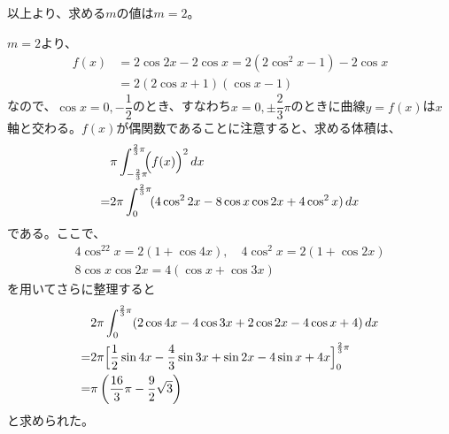 以上より、求める$m$の値は$m=2$。

$m=2$より、
\begin{align*}
 f(x)&=2\cos2x-2\cos x=2(2\cos^2x-1)-2\cos x \\
 &=2(2\cos x+1)(\cos x-1)
\end{align*}
なので、$\cos x=0, -\dfrac{1}{2}$のとき、すなわち$x=0, \pm\dfrac{2}{3}\pi$のときに曲線$y=f(x)$は$x$軸と交わる。$f(x)$が偶関数であることに注意すると、求める体積は、
\begin{align*}
 &\pi\int_{-\frac{2}{3}\pi}^{\frac{2}{3}\pi}\!\!\Bigl(f(x)\Bigr)^2 \,dx \\
 =& 2\pi\int_0^{\frac{2}{3}\pi}\!(4\cos^22x-8\cos x\cos 2x+4\cos^2 x) \,dx
\end{align*}
である。ここで、
\begin{align*}
 4\cos^22x=2(1+\cos 4x),\quad 4\cos^2x=2(1+\cos 2x) \\
 8\cos x\cos 2x=4(\cos x+\cos 3x)
\end{align*}
を用いてさらに整理すると
\begin{align*}
 & 2\pi\int_0^{\frac{2}{3}\pi}(2\cos 4x -4\cos 3x+2\cos 2x -4\cos x+4) \,dx \\
 =& 2\pi\Bigl[\frac{1}{2}\sin 4x-\frac{4}{3}\sin 3x+\sin 2x -4\sin x + 4x \Bigr]_0^{\frac{2}{3}\pi} \\
 =& \pi\left(\frac{16}{3}\pi-\frac{9}{2}\sqrt{3}\right)
\end{align*}
と求められた。